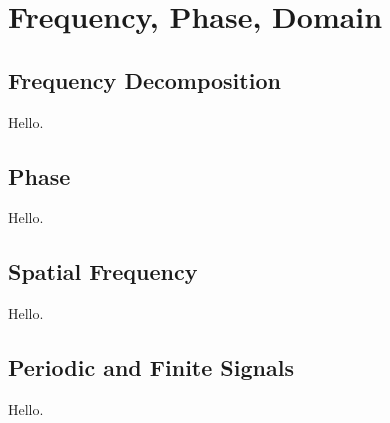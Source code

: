 \chapter{Frequency, Phase, Domain}

\section{Frequency Decomposition}
Hello.

\section{Phase}
Hello.

\section{Spatial Frequency}
Hello.

\section{Periodic and Finite Signals}
Hello.
